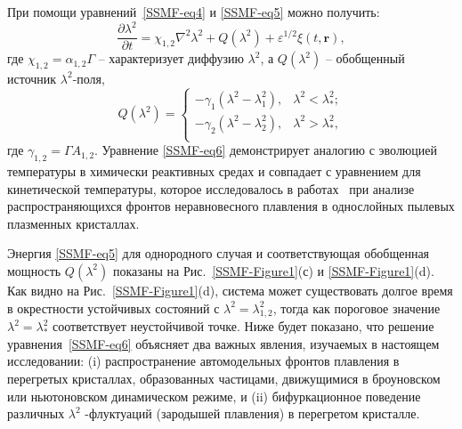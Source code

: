 При помощи уравнений~\eqref{SSMF-eq4} и \eqref{SSMF-eq5} можно получить:
\begin{equation}
\label{SSMF-eq6}
\frac{\partial \lambda^2}{\partial t} = \chi_{1,2} \nabla^2\lambda^2 + Q(\lambda^2) +  \varepsilon^{1/2}\xi(t,\mathbf{r}),
\end{equation}
где $ \chi_{1,2} = \alpha_{1,2} \Gamma $ -- характеризует диффузию $\lambda^2$,
а $ Q (\lambda ^ 2) $ -- обобщенный источник $ \lambda^2$-поля,
\begin{equation}
\label{SSMF-eq7}
Q(\lambda^2) =
\left\{
  \begin{array}{ll}
   -\gamma_{1}\left(\lambda^2-\lambda_{1}^2\right), & \lambda^2  < \lambda_\ast^2;\\
   -\gamma_{2}\left(\lambda^2-\lambda_{2}^2\right), & \lambda^2 > \lambda_\ast^2,\\
  \end{array}
\right.
\end{equation}
где $\gamma_{1,2} = \Gamma A_{1,2}$.
Уравнение \eqref{SSMF-eq6} демонстрирует аналогию с эволюцией температуры в химически реактивных средах \cite{10.1088/0004-637x/805/1/59} и совпадает с уравнением для кинетической температуры, которое исследовалось в работах~\cite{10.1103/physreve.96.043201, 10.1103/physreve.97.043206, 10.1103/physreve.100.023203} при анализе распространяющихся фронтов неравновесного плавления в однослойных пылевых плазменных кристаллах.

Энергия \eqref{SSMF-eq5} для однородного случая и соответствующая обобщенная мощность $ Q (\lambda ^ 2) $ показаны на Рис.~\ref{SSMF-Figure1}(с) и \ref{SSMF-Figure1}(d).
Как видно на Рис.~\ref{SSMF-Figure1}(d), система может существовать долгое время в окрестности устойчивых состояний с $\lambda^2= \lambda_{1,2} ^ 2 $, тогда как пороговое значение $\lambda^2=\lambda_\ast^2$ соответствует неустойчивой точке.
Ниже будет показано, что решение уравнения~\eqref{SSMF-eq6} объясняет два важных явления, изучаемых в настоящем исследовании:
(i) распространение автомодельных фронтов плавления в перегретых кристаллах, образованных частицами, движущимися в броуновском или ньютоновском динамическом режиме, и (ii) бифуркационное поведение различных $\lambda^2$ -флуктуаций (зародышей плавления) в перегретом кристалле.

